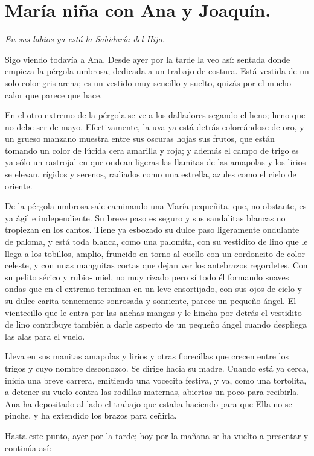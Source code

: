 \documentclass[12pt]{book} %
\begin{document}
\chapter{María niña con Ana y Joaquín.}
\emph{En sus labios ya está la Sabiduría del Hijo.}
 
Sigo viendo todavía a Ana. Desde ayer por la tarde la veo así: sentada donde empieza la pérgola umbrosa; dedicada a un trabajo de costura. Está vestida de un solo color gris arena; es un vestido muy sencillo y suelto, quizás por el mucho calor que parece que hace. 

En el otro extremo de la pérgola se ve a los dalladores segando el heno; heno que no debe ser de mayo. Efectivamente, la uva ya está detrás coloreándose de oro, y un grueso manzano muestra entre sus oscuras hojas sus frutos, que están tomando un color de lúcida cera amarilla y roja; y además el campo de trigo es ya sólo un rastrojal en que ondean ligeras las llamitas de las amapolas y los lirios se elevan, rígidos y serenos, radiados como una estrella, azules como el cielo de oriente. 

De la pérgola umbrosa sale caminando una María pequeñita, que, no obstante, es ya ágil e independiente. Su breve paso es seguro y sus sandalitas blancas no tropiezan en los cantos. Tiene ya esbozado su dulce paso ligeramente ondulante de paloma, y está toda blanca, como una palomita, con su vestidito de lino que le llega a los tobillos, amplio, fruncido en torno al cuello con un cordoncito de color celeste, y con unas manguitas cortas que dejan ver los antebrazos regordetes. Con su pelito sérico y rubio- miel, no muy rizado pero sí todo él formando suaves ondas que en el extremo terminan en un leve ensortijado, con sus ojos de cielo y su dulce carita tenuemente sonrosada y sonriente, parece un pequeño ángel. El vientecillo que le entra por las anchas mangas y le hincha por detrás el vestidito de lino contribuye también a darle aspecto de un pequeño ángel cuando despliega las alas para el vuelo. 

Lleva en sus manitas amapolas y lirios y otras florecillas que crecen entre los trigos y cuyo nombre desconozco. Se dirige hacia su madre. Cuando está ya cerca, inicia una breve carrera, emitiendo una vocecita festiva, y va, como una tortolita, a detener su vuelo contra las rodillas maternas, abiertas un poco para recibirla. Ana ha depositado al lado el trabajo que estaba haciendo para que Ella no se pinche, y ha extendido los brazos para ceñirla. 

Hasta este punto, ayer por la tarde; hoy por la mañana se ha vuelto a presentar y continúa así: 
\end{document}
